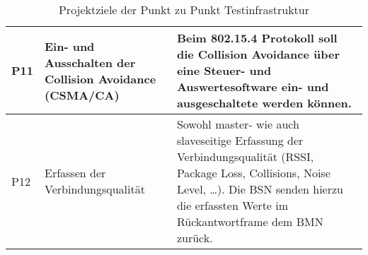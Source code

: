 \begin{table}[H]
\begin{tabular}{ | C{0.7cm} | p{3.7cm} | p{10.2cm} |}
		P11 & Ein- und Ausschalten der Collision Avoidance (CSMA/CA)& Beim 802.15.4 Protokoll soll die Collision Avoidance über eine Steuer- und Auswertesoftware ein- und ausgeschaltete werden können.\\ \hline
		
		P12 & Erfassen der Verbindungsqualität & Sowohl master- wie auch slaveseitige Erfassung der Verbindungsqualität (RSSI, Package Loss, Collisions, Noise Level, …). Die BSN senden hierzu die erfassten Werte im Rückantwortframe dem BMN zurück.\\ \hline

		
	\end{tabular}\\
	\caption{Projektziele der Punkt zu Punkt Testinfrastruktur}
	\label{tab:ProjektzielederPunktzuPunktTestinfrastruktur}
\end{table}


